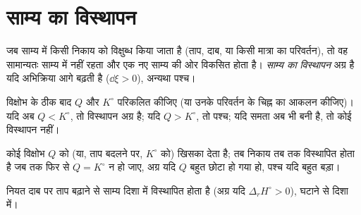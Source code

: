 \section{साम्य का विस्थापन}

\begin{definition}[साम्य का विस्थापन]\label{def:b2:equilibrium-shifts:shift}
जब साम्य में किसी निकाय को विक्षुब्ध किया जाता है (ताप, दाब, या किसी मात्रा
का परिवर्तन), तो वह सामान्यतः साम्य में नहीं रहता और एक नए साम्य की ओर
विकसित होता है। \emph{साम्य का विस्थापन}
अग्र है यदि अभिक्रिया आगे बढ़ती है ($\dd\xi > 0$), अन्यथा
पश्च।
\end{definition}

\begin{method}[विस्थापन का पूर्वानुमान]\label{met:b2:equilibrium-shifts:predict-shift}
विक्षोभ के ठीक बाद $Q$ और $K^\circ$ परिकलित कीजिए (या उनके परिवर्तन के चिह्न
का आकलन कीजिए)। यदि अब $Q < K^\circ$, तो विस्थापन अग्र है; यदि $Q > K^\circ$,
तो पश्च; यदि समता अब भी बनी है, तो कोई विस्थापन नहीं।
\end{method}

\begin{omfigure}

{\small कोई विक्षोभ $Q$ को (या, ताप बदलने पर, $K^\circ$ को) खिसका देता है;
तब निकाय तब तक विस्थापित होता है जब तक फिर से $Q = K^\circ$ न हो जाए, अग्र यदि $Q$
बहुत छोटा हो गया हो, पश्च यदि बहुत बड़ा।}
\end{omfigure}

\begin{proposition}[ताप]\label{prop:b2:equilibrium-shifts:temperature}
नियत दाब पर ताप बढ़ाने से साम्य  दिशा में
विस्थापित होता है (अग्र यदि $\Delta_r H^\circ > 0$), घटाने से
 दिशा में।
\end{proposition}

